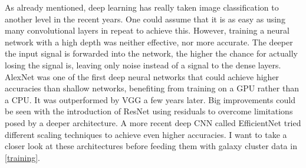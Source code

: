 As already mentioned, deep learning has really taken image classification to another level in the recent years. One could assume that it is as easy as using many convolutional layers in repeat to achieve this. However, training a neural network with a high depth was neither effective, nor more accurate. The deeper the input signal is forwarded into the network, the higher the chance for actually losing the signal is, leaving only noise instead of a signal to the dense layers. AlexNet \citep{Krizhevsky_2012} was one of the first deep neural networks that could achieve higher accuracies than shallow networks, benefiting from training on a GPU rather than a CPU. It was outperformed by VGG \citep{Simonyan_2015} a few years later. Big improvements could be seen with the introduction of ResNet \citep{He_2016} using residuals to overcome limitations posed by a deeper architecture. A more recent deep CNN called EfficientNet \citep{tan2020efficientnet} tried different scaling techniques to achieve even higher accuracies. I want to take a closer look at these architectures before feeding them with galaxy cluster data in \autoref{training}.